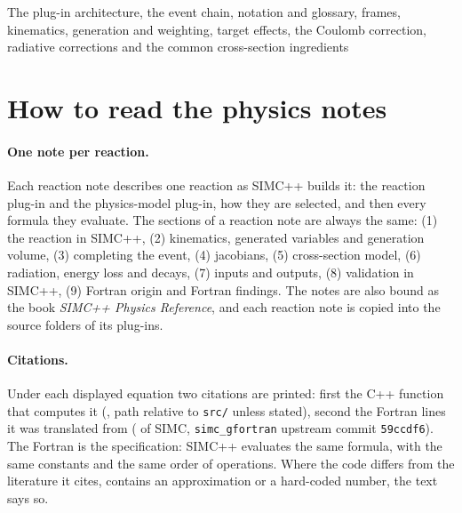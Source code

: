 \documentclass{simcnote}
\begin{document}
%
  {The plug-in architecture, the event chain, notation and glossary, frames, kinematics, generation and weighting,
   target effects, the Coulomb correction, radiative corrections and the common cross-section ingredients}
\simcnotemaketitle
{}
\simcnotetoc

\section{How to read the physics notes}

\paragraph{One note per reaction.} Each reaction note describes one reaction as SIMC++ builds it: the reaction
plug-in and the physics-model plug-in, how they are selected, and then every formula they evaluate. The sections of a
reaction note are always the same: (1) the reaction in SIMC++, (2) kinematics, generated variables and generation
volume, (3) completing the event, (4) jacobians, (5) cross-section model, (6) radiation, energy loss and decays,
(7) inputs and outputs, (8) validation in SIMC++, (9) Fortran origin and Fortran findings. The notes are also bound as
the book \emph{SIMC++ Physics Reference}, and each reaction note is copied into the source folders of its plug-ins.

\paragraph{Citations.} Under each displayed equation two citations are printed: first the C++ function that computes
it (, path relative to \texttt{src/} unless stated), second the Fortran lines it was translated
from ( of SIMC, \texttt{simc\_gfortran} upstream commit \texttt{59ccdf6}). The Fortran is the
specification: SIMC++ evaluates the same formula, with the same constants and the same order of operations. Where the
code differs from the literature it cites, contains an approximation or a hard-coded number, the text says so.
\end{document}
